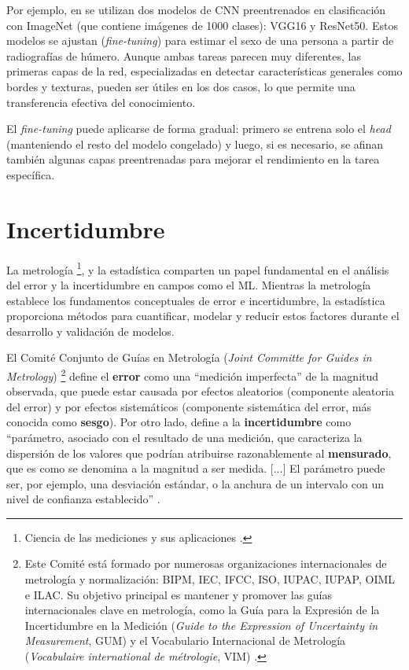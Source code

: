 Por ejemplo, en \cite{venema2022} se utilizan dos modelos de CNN preentrenados en clasificación con ImageNet 
(que contiene imágenes de 1000 clases): VGG16 y ResNet50. Estos modelos se ajustan (\textit{fine-tuning}) 
para estimar el sexo de una persona a partir de radiografías de húmero. Aunque ambas tareas parecen muy 
diferentes, las primeras capas de la red, especializadas en detectar características generales como bordes y 
texturas, pueden ser útiles en los dos casos, lo que permite una transferencia efectiva del conocimiento.

El \textit{fine-tuning} puede aplicarse de forma gradual: primero se entrena solo el \textit{head} 
(manteniendo el resto del modelo congelado) y luego, si es necesario, se afinan también algunas capas 
preentrenadas para mejorar el rendimiento en la tarea específica.



\section{Incertidumbre}

La metrología
\footnote{
    Ciencia de las mediciones y sus aplicaciones \cite{jcgm200:2012}.
},
y la estadística comparten un papel fundamental en el análisis del error y la incertidumbre en campos como 
el ML. Mientras la metrología establece los fundamentos conceptuales de error e incertidumbre, la estadística 
proporciona métodos para cuantificar, modelar y reducir estos factores durante el desarrollo y validación de 
modelos.

El Comité Conjunto de Guías en Metrología (\textit{Joint Committe for Guides in Metrology})
\footnote{
    Este Comité está formado por numerosas organizaciones internacionales de metrología y normalización: 
    BIPM, IEC, IFCC, ISO, IUPAC, IUPAP, OIML e ILAC. Su objetivo principal es mantener y promover las 
    guías internacionales clave en metrología, como la Guía para la Expresión de la Incertidumbre en la 
    Medición (\textit{Guide to the Expression of Uncertainty in Measurement}, GUM) \cite{jcgm100:2008} y el 
    Vocabulario Internacional de Metrología (\textit{Vocabulaire international de métrologie}, VIM) 
    \cite{jcgm200:2012}.
}
define el \textbf{error} como una ``medición imperfecta'' de la magnitud observada, que puede estar causada
por efectos aleatorios (componente aleatoria del error) y por efectos sistemáticos (componente sistemática del 
error, más conocida como \textbf{sesgo}).
Por otro lado, define a la \textbf{incertidumbre} como ``parámetro, asociado con el resultado de una medición, 
que caracteriza la dispersión de los valores que podrían atribuirse razonablemente al \textbf{mensurado}, que
es como se denomina a la magnitud a ser medida. [...] El parámetro puede ser, por ejemplo, una desviación 
estándar, o la anchura de un intervalo con un nivel de confianza establecido'' \cite{jcgm100:2008}.

